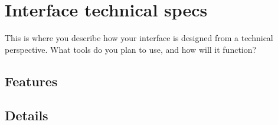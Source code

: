 \section{Interface technical specs} %
This is where you describe how your interface is designed from a technical perspective. What tools do you plan to use, and how will it function?
\subsection{Features} %

\subsection{Details} %